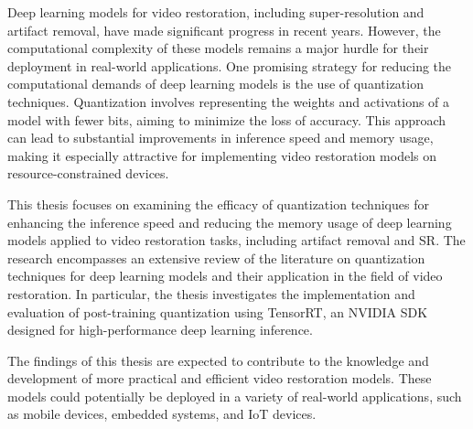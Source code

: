Deep learning models for video restoration, including super-resolution and artifact removal, have made significant progress in recent years. However, the computational complexity of these models remains a major hurdle for their deployment in real-world applications. One promising strategy for reducing the computational demands of deep learning models is the use of quantization techniques. Quantization involves representing the weights and activations of a model with fewer bits, aiming to minimize the loss of accuracy. This approach can lead to substantial improvements in inference speed and memory usage, making it especially attractive for implementing video restoration models on resource-constrained devices.

This thesis focuses on examining the efficacy of quantization techniques for enhancing the inference speed and reducing the memory usage of deep learning models applied to video restoration tasks, including artifact removal and SR. The research encompasses an extensive review of the literature on quantization techniques for deep learning models and their application in the field of video restoration. In particular, the thesis investigates the implementation and evaluation of post-training quantization using TensorRT, an NVIDIA SDK designed for high-performance deep learning inference.

The findings of this thesis are expected to contribute to the knowledge and development of more practical and efficient video restoration models. These models could potentially be deployed in a variety of real-world applications, such as mobile devices, embedded systems, and IoT devices.

